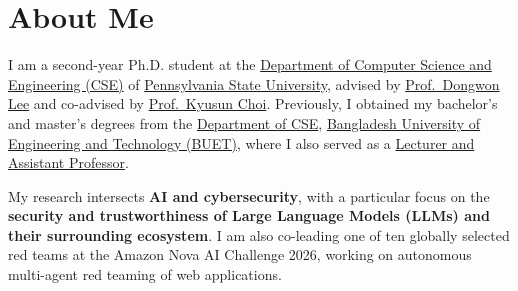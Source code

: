 \section{About Me}
I am a second-year Ph.D. student at the \href{https://www.eecs.psu.edu/departments/EECS-Departments-Computer-Science-Engineering3.aspx}{Department of Computer Science and Engineering (CSE)} of \href{https://www.psu.edu/}{Pennsylvania State University}, advised by \href{https://pike.psu.edu/dongwon/}{Prof.\ Dongwon Lee} and co-advised by \href{https://www.cse.psu.edu/~kxc104/}{Prof.\ Kyusun Choi}. Previously, I obtained my bachelor's and master's degrees from the \href{https://cse.buet.ac.bd/}{Department of CSE}, \href{https://www.buet.ac.bd/web/#/}{Bangladesh University of Engineering and Technology (BUET)}, where I also served as a \href{https://cse.buet.ac.bd/faculty/faculty_detail/toufikuzzaman}{Lecturer and Assistant Professor}.

My research intersects \textbf{AI and cybersecurity}, with a particular focus on the \textbf{security and trustworthiness of Large Language Models (LLMs) and their surrounding ecosystem}. I am also co-leading one of ten globally selected red teams at the Amazon Nova AI Challenge 2026, working on autonomous multi-agent red teaming of web applications.
\endinput

